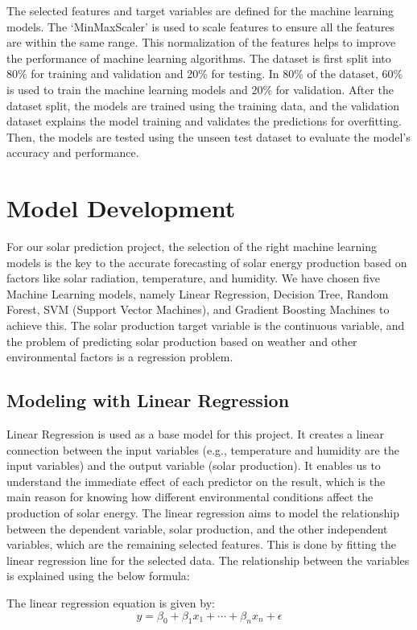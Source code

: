 \documentclass[conference]{IEEEtran}
\begin{document}
The selected features and target variables are defined for the machine learning models. The ‘MinMaxScaler’ is used to scale features to ensure all the features are within the same range. This normalization of the features helps to improve the performance of machine learning algorithms. The dataset is first split into 80\% for training and validation and 20\% for testing. In 80\% of the dataset, 60\% is used to train the machine learning models and 20\% for validation. After the dataset split, the models are trained using the training data, and the validation dataset explains the model training and validates the predictions for overfitting. Then, the models are tested using the unseen test dataset to evaluate the model's accuracy and performance.

\section{Model Development}
For our solar prediction project, the selection of the right machine learning models is the key to the accurate forecasting of solar energy production based on factors like solar radiation, temperature, and humidity. We have chosen five Machine Learning models, namely Linear Regression, Decision Tree, Random Forest, SVM (Support Vector Machines), and Gradient Boosting Machines to achieve this. The solar production target variable is the continuous variable, and the problem of predicting solar production based on weather and other environmental factors is a regression problem.
\subsection{Modeling with Linear Regression}
Linear Regression is used as a base model for this project. It creates a linear connection between the input variables (e.g., temperature and humidity are the input variables) and the output variable (solar production). It enables us to understand the immediate effect of each predictor on the result, which is the main reason for knowing how different environmental conditions affect the production of solar energy.	
The linear regression aims to model the relationship between the dependent variable, solar production, and the other independent variables, which are the remaining selected features. This is done by fitting the linear regression line for the selected data. The relationship between the variables is explained using the below formula:

The linear regression equation is given by:
\[
y = \beta_0 + \beta_1 x_1 + \cdots + \beta_n x_n + \epsilon
\]
	
\end{document}
